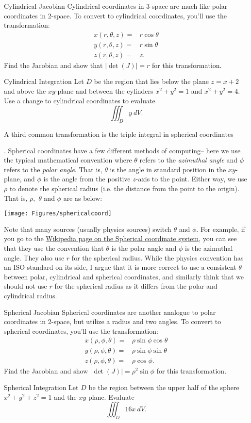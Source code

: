 \begin{exercise}{Cylindrical Jacobian}
Cylindrical coordinates in 3-space are much like polar coordinates in 2-space. To convert to cylindrical coordinates, you'll use the transformation:
\begin{align*}
x(r,\theta,z)=&r\cos\theta\\
y(r,\theta,z)=&r\sin\theta\\
z(r,\theta,z)=&z.
\end{align*}
Find the Jacobian and show that $|\det(J)|=r$ for this transformation.
\end{exercise}

\begin{exercise}{Cylindrical Integration}
Let $D$ be the region that lies below the plane $z=x+2$ and above the $xy$-plane and between the cylinders $x^2+y^2=1$ and $x^2+y^2=4$. Use a change to cylindrical coordinates to evaluate $$\iiint_D y\ dV. $$
\end{exercise}

\hypertarget{spherical}{A third common transformation is the triple integral in spherical coordinates}. Spherical coordinates have a few different methods of computing-- here we use the typical mathematical convention where $\theta$ refers to the \textit{azimuthal angle} and $\phi$ refers to the \textit{polar angle}. That is, $\theta$ is the angle in standard position in the $xy$-plane, and $\phi$ is the angle from the positive $z$-axis to the point. Either way, we use $\rho$ to denote the spherical radius (i.e. the distance from the point to the origin). That is, $\rho,$ $ \theta$ and $\phi$ are as below:

\begin{center}%
\texttt{[image: Figures/sphericalcoord]}
\end{center}

Note that many sources (usually physics sources) switch $\theta$ and $\phi$. For example, if you go to the \href{}{Wikipedia page on the Spherical coordinate system}, you can see that they use the convention that $\theta$ is the polar angle and $\phi$ is the azimuthal angle. They also use $r$ for the spherical radius. While the physics convention has an ISO standard on its side, I argue that it is more correct to use a consistent $\theta$ between polar, cylindrical and spherical coordinates, and similarly think that we should not use $r$ for the spherical radius as it differs from the polar and cylindrical radius.

\begin{exercise}{Spherical Jacobian}
Spherical coordinates are another analogue to polar coordinates in 2-space, but utilize a radius and two angles. To convert to spherical coordinates, you'll use the transformation:
\begin{align*}
x(\rho,\phi,\theta)=&\rho\sin\phi\cos\theta\\
y(\rho,\phi,\theta)=&\rho\sin\phi\sin\theta\\
z(\rho,\phi,\theta)=&\rho\cos\phi.
\end{align*}
Find the Jacobian and show $|\det(J)|=\rho^2\sin\phi$ for this transformation.
\end{exercise}

\begin{exercise}{Spherical Integration}
Let $D$ be the region between the upper half of the sphere $x^2+y^2+z^2=1$ and the $xy$-plane. Evaluate $$\iiint_D 16x\ dV. $$
\end{exercise}
